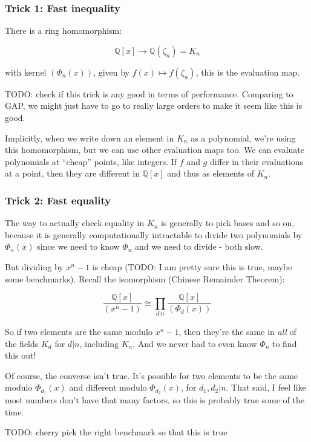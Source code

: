 \documentclass{article}
\begin{document}
\subsubsection{Trick 1: Fast inequality}

There is a ring homomorphism:

$$\mathbb{Q}[x] \to \mathbb{Q}(\zeta_n) = K_n$$

with kernel $(\Phi_n(x))$, given by $f(x) \mapsto f(\zeta_n)$, this is
the evaluation map.

TODO: check if this trick is any good in terms of
performance. Comparing to GAP, we might just have to go to really
large orders to make it seem like this is good.

Implicitly, when we write down an element in $K_n$ as a polynomial,
we're using this homomorphism, but we can use other evaluation maps
too. We can evaluate polynomials at ``cheap'' points, like
integers. If $f$ and $g$ differ in their evaluations at a point, then
they are different in $\mathbb{Q}[x]$ and thus as elements of $K_n$.

\subsubsection{Trick 2: Fast equality}

The way to actually check equality in $K_n$ is generally to pick bases
and so on, because it is generally computationally intractable to
divide two polynomials by $\Phi_n(x)$ since we need to know $\Phi_n$
and we need to divide - both slow.

But dividing by $x^n - 1$ is cheap (TODO: I am pretty sure this is
true, maybe some benchmarks). Recall the isomorphism (Chinese
Remainder Theorem):

$$\frac{\mathbb{Q}[x]}{(x^n-1)} \cong \prod_{d | n}\frac{\mathbb{Q}[x]}{(\Phi_d(x))}$$

So if two elements are the same modulo $x^n-1$, then they're the same
in \emph{all} of the fields $K_d$ for $d | n$, including $K_n$. And we
never had to even know $\Phi_n$ to find this out!

Of course, the converse isn't true. It's possible for two elements to
be the same modulo $\Phi_{d_1}(x)$ and different modulo
$\Phi_{d_2}(x)$, for $d_1, d_2 | n$. That said, I feel like most
numbers don't have that many factors, so this is probably true some of
the time.

TODO: cherry pick the right benchmark so that this is true
\end{document}
